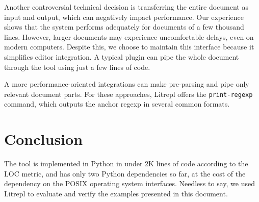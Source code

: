 \documentclass[letterpaper,12pt,twocolumn]{article}
\begin{document}
Another controversial technical decision is transferring the entire document as
input and output, which can negatively impact performance. Our experience shows
that the system performs adequately for documents of a few thousand lines.
However, larger documents may experience uncomfortable delays, even on modern
computers. Despite this, we choose to maintain this interface because it
simplifies editor integration. A typical plugin can pipe the whole document
through the tool using just a few lines of code.

A more performance-oriented integrations can make pre-parsing and pipe only
relevant document parts. For these approaches, Litrepl offers the
\verb|print-regexp| command, which outputs the anchor regexp in several common
formats.

\section{Conclusion}

The tool is implemented in Python in under 2K lines of code according to the LOC
metric, and has only two Python dependencies so far, at the cost of the
dependency on the POSIX operating system interfaces. Needless to say, we used
Litrepl to evaluate and verify the examples presented in this document.

\printbibliography
\end{document}
